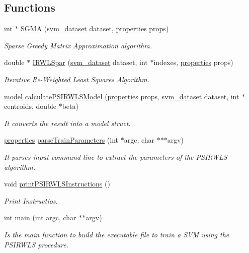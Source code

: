 \subsection*{Functions}
\begin{DoxyCompactItemize}
\item 
int $\ast$ \hyperlink{PSIRWLS-train_8c_a50a6e1f36a010feb91db9b9b38679948}{S\+G\+MA} (\hyperlink{structsvm__dataset}{svm\+\_\+dataset} dataset, \hyperlink{structproperties}{properties} props)
\begin{DoxyCompactList}\small\item\em Sparse Greedy Matrix Approximation algorithm. \end{DoxyCompactList}\item 
double $\ast$ \hyperlink{PSIRWLS-train_8c_ad51d9a46645ad0b0bedb1113a3807d24}{I\+R\+W\+L\+Spar} (\hyperlink{structsvm__dataset}{svm\+\_\+dataset} dataset, int $\ast$indexes, \hyperlink{structproperties}{properties} props)
\begin{DoxyCompactList}\small\item\em Iterative Re-\/\+Weighted Least Squares Algorithm. \end{DoxyCompactList}\item 
\hyperlink{structmodel}{model} \hyperlink{PSIRWLS-train_8c_a71b4329438bbf3210414315619f7b804}{calculate\+P\+S\+I\+R\+W\+L\+S\+Model} (\hyperlink{structproperties}{properties} props, \hyperlink{structsvm__dataset}{svm\+\_\+dataset} dataset, int $\ast$centroids, double $\ast$beta)
\begin{DoxyCompactList}\small\item\em It converts the result into a model struct. \end{DoxyCompactList}\item 
\hyperlink{structproperties}{properties} \hyperlink{PSIRWLS-train_8c_a67566f6fd6aec7278ca360186af4e91b}{parse\+Train\+Parameters} (int $\ast$argc, char $\ast$$\ast$$\ast$argv)
\begin{DoxyCompactList}\small\item\em It parses input command line to extract the parameters of the P\+S\+I\+R\+W\+LS algorithm. \end{DoxyCompactList}\item 
void \hyperlink{PSIRWLS-train_8c_af71e97e89750872ce608bffd01d2af41}{print\+P\+S\+I\+R\+W\+L\+S\+Instructions} ()
\begin{DoxyCompactList}\small\item\em Print Instructios. \end{DoxyCompactList}\item 
\hypertarget{PSIRWLS-train_8c_a3c04138a5bfe5d72780bb7e82a18e627}{}\label{PSIRWLS-train_8c_a3c04138a5bfe5d72780bb7e82a18e627} 
int \hyperlink{PSIRWLS-train_8c_a3c04138a5bfe5d72780bb7e82a18e627}{main} (int argc, char $\ast$$\ast$argv)
\begin{DoxyCompactList}\small\item\em Is the main function to build the executable file to train a S\+VM using the P\+S\+I\+R\+W\+LS procedure. \end{DoxyCompactList}\end{DoxyCompactItemize}


